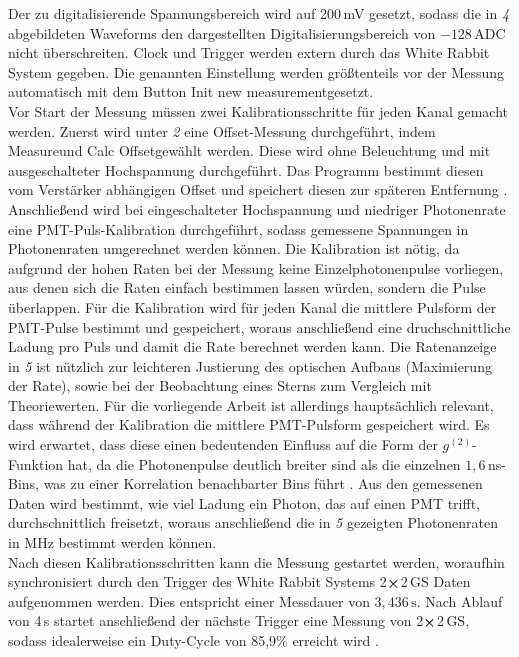 Der zu digitalisierende Spannungsbereich wird auf 200\,mV gesetzt, sodass die in \emph{4} abgebildeten Waveforms den dargestellten Digitalisierungsbereich von $-128\,\mathrm{ADC}$ nicht überschreiten. 
Clock und Trigger werden extern durch das White Rabbit System gegeben. 
Die genannten Einstellung werden größtenteils vor der Messung automatisch mit dem Button \glqq Init new measurement\grqq\;gesetzt. \\
Vor Start der Messung müssen zwei Kalibrationsschritte für jeden Kanal gemacht werden. 
Zuerst wird unter \emph{2} eine Offset-Messung durchgeführt, indem \glqq Measure\grqq\;und \glqq Calc Offset\grqq\;gewählt werden. 
Diese wird ohne Beleuchtung und mit ausgeschalteter Hochspannung durchgeführt. 
Das Programm bestimmt diesen vom Verstärker abhängigen Offset und speichert diesen zur späteren Entfernung \cite{zmijaOpticalIntensityInterferometry2021}. 
Anschließend wird bei eingeschalteter Hochspannung und niedriger Photonenrate eine PMT-Puls-Kalibration durchgeführt, sodass gemessene Spannungen in Photonenraten umgerechnet werden können. 
Die Kalibration ist nötig, da aufgrund der hohen Raten bei der Messung keine Einzelphotonenpulse vorliegen, aus denen sich die Raten einfach bestimmen lassen würden, sondern die Pulse überlappen.
Für die Kalibration wird für jeden Kanal die mittlere Pulsform der PMT-Pulse bestimmt und gespeichert, woraus anschließend eine druchschnittliche Ladung pro Puls und damit die Rate berechnet werden kann.
Die Ratenanzeige in \emph{5} ist nützlich zur leichteren Justierung des optischen Aufbaus (Maximierung der Rate), sowie bei der Beobachtung eines Sterns zum Vergleich mit Theoriewerten.
Für die vorliegende Arbeit ist allerdings hauptsächlich relevant, dass während der Kalibration die mittlere PMT-Pulsform gespeichert wird.
Es wird erwartet, dass diese einen bedeutenden Einfluss auf die Form der $g^{(2)}$-Funktion hat, da die Photonenpulse deutlich breiter sind als die einzelnen $1{,}6$\,ns-Bins, was zu einer Korrelation benachbarter Bins führt \cite{zmijaOpticalIntensityInterferometry2021}. 
Aus den gemessenen Daten wird bestimmt, wie viel Ladung ein Photon, das auf einen PMT trifft, durchschnittlich freisetzt, woraus anschließend die in \emph{5} gezeigten Photonenraten in MHz bestimmt werden können. \\
Nach diesen Kalibrationsschritten kann die Messung gestartet werden, woraufhin synchronisiert durch den Trigger des White Rabbit Systems 2$\cross$2\,GS Daten aufgenommen werden. 
Dies entspricht einer Messdauer von $3{,}436\,\mathrm{s}$. 
Nach Ablauf von 4\,s startet anschließend der nächste Trigger eine Messung von 2$\cross$2\,GS, sodass idealerweise ein Duty-Cycle von 85{,}9\% erreicht wird \cite{zmijaFirstIntensityInterferometry2023}. 

